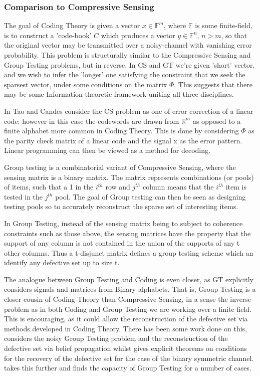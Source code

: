 \documentclass[12pt, a4paper]{article}
\begin{document}
\subsubsection{Comparison to Compressive Sensing}
The goal of Coding Theory is given a vector \(x \in \mathbb{F}^m\), where \(\mathbb{F}\) is some finite-field, is to construct a 'code-book' \(C\) which produces a vector \(y \in \mathbb{F}^n\), \(n > m\), so that the original vector may be transmitted over a noisy-channel with vanishing error probability. This problem is structurally similar to the Compressive Sensing and Group Testing problems, but in reverse. In CS and GT we're given 'short' vector, and we wish to infer the 'longer' one satisfying the constraint that we seek the sparsest vector, under some conditions on the matrix \(\Phi\). This suggests that there may be some Information-theoretic framework uniting all three disciplines. 

In \cite{Emma} Tao and Candes consider the CS problem as one of error correction of a linear code: however in this case the codewords are drawn from \(\mathbb{R}^m\) as opposed to a finite alphabet more common in Coding Theory. This is done by considering \(\Phi\) as the parity check matrix of a linear code and the signal x as the error pattern. Linear programming can then be viewed as a method for decoding. 

Group testing is a combinatorial variant of Compressive Sensing, where the sensing matrix is a binary matrix. The matrix represents combinations (or pools) of items, such that a 1 in the \(i^{th}\) row and \(j^{th}\) column means that  the \(i^{th}\) item is tested in the \(j^{th}\) pool. The goal of Group testing can then be seen as designing testing pools so to accurately reconstruct the sparse set of interesting items. 

In Group Testing, instead of the sensing matrix being to subject to coherence constraints such as those above, the sensing matrices have the property that the support of any column is not contained in the union of the supports of any t other columns. Thus a t-disjunct matrix defines a group testing scheme which an identify any defective set up to size t.

The analogue between Group Testing and Coding is even closer, as GT explicitly considers signals and matrices from Binary alphabets. That is, Group Testing is a closer cousin of Coding Theory than Compressive Sensing, in a sense the inverse problem as in both Coding and Group Testing we are working over a finite field. This is encouraging, as it could allow the reconstruction of the defective set via methods developed in Coding Theory. There has been some work done on this, \cite{Sejdinovic2010} considers the noisy Group Testing problem and the reconstruction of the defective set via belief propagation whilst \cite{Wadayama2013} gives explicit theorems on conditions for the recovery of the defective set for the case of the binary symmetric channel. \cite{Baldassini2013} takes this further and finds the capacity of Group Testing for a number of cases. 
\end{document}
